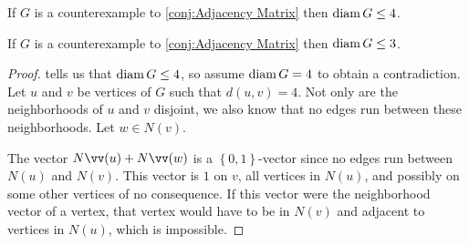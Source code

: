 \begin{corollary}\label{cor:diam G leq 4}If $G$ is a counterexample to \autoref{conj:Adjacency Matrix} then $\operatorname{diam} G \leq 4$.
\end{corollary}

\begin{proposition}\label{prop:diam G leq 3}If $G$ is a counterexample to \autoref{conj:Adjacency Matrix} then $\operatorname{diam} G \leq 3$.
\end{proposition}
\begin{proof} tells us that $\operatorname{diam} G \leq 4$, so assume $\operatorname{diam} G = 4$ to obtain a contradiction. Let $u$ and $v$ be vertices of $G$ such that $d\left(u,v\right) = 4$. Not only are the neighborhoods of $u$ and $v$ disjoint, we also know that no edges run between these neighborhoods. Let $w\in N\left(v\right)$.

\begin{center}\end{center}

The vector $\nvect{u}+\nvect{w}$ is a $\left\{0,1\right\}$-vector since no edges run between $N\left(u\right)$ and $N\left(v\right)$. This vector is $1$ on $v$, all vertices in $N\left(u\right)$, and possibly on some other vertices of no consequence. If this vector were the neighborhood vector of a vertex, that vertex would have to be in $N\left(v\right)$ and adjacent to vertices in $N\left(u\right)$, which is impossible.
\end{proof}

